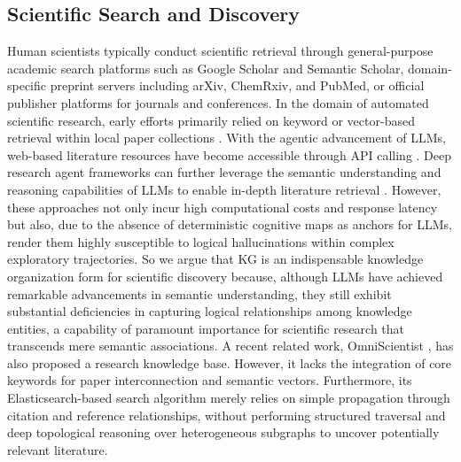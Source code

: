 \documentclass{llmxive}
\begin{document}
\subsection{Scientific Search and Discovery}
Human scientists typically conduct scientific retrieval through general-purpose academic search platforms such as Google Scholar and Semantic Scholar, domain-specific preprint servers including arXiv, ChemRxiv, and PubMed, or official publisher platforms for journals and conferences.
In the domain of automated scientific research, early efforts primarily relied on keyword or vector-based retrieval within local paper collections \citep{researchagent,virsci,rnd,scipip}.
With the agentic advancement of LLMs, web-based literature resources have become accessible through API calling \citep{can-llm-gen-novel,chain-of-ideas,deep-ideation,ai-researcher,internagent,innoeval}.
Deep research agent frameworks can further leverage the semantic understanding and reasoning capabilities of LLMs to enable in-depth literature retrieval \citep{deepxiv,wispaper,opennovelty}.
However, these approaches not only incur high computational costs and response latency but also, due to the absence of deterministic cognitive maps as anchors for LLMs, render them highly susceptible to logical hallucinations within complex exploratory trajectories.
So we argue that KG is an indispensable knowledge organization form for scientific discovery because, although LLMs have achieved remarkable advancements in semantic understanding, they still exhibit substantial deficiencies in capturing logical relationships among knowledge entities, a capability of paramount importance for scientific research that transcends mere semantic associations.
A recent related work, OmniScientist \citep{omniscientist}, has also proposed a research knowledge base.
However, it lacks the integration of core keywords for paper interconnection and semantic vectors.
Furthermore, its Elasticsearch-based search algorithm merely relies on simple propagation through citation and reference relationships, without performing structured traversal and deep topological reasoning over heterogeneous subgraphs to uncover potentially relevant literature.
\end{document}
